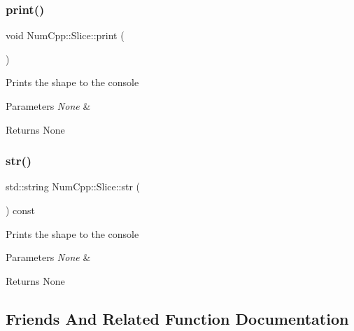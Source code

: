 \subsubsection{\texorpdfstring{print()}{print()}}
{\footnotesize\ttfamily void Num\+Cpp\+::\+Slice\+::print (\begin{DoxyParamCaption}{ }\end{DoxyParamCaption})\hspace{0.3cm}{\ttfamily [inline]}}

Prints the shape to the console


\begin{DoxyParams}{Parameters}
{\em None} & \\
\hline
\end{DoxyParams}
\begin{DoxyReturn}{Returns}
None 
\end{DoxyReturn}
\mbox{\label{class_num_cpp_1_1_slice_a1d653c371a7933ed07c0a0862779edea}} 
\subsubsection{\texorpdfstring{str()}{str()}}
{\footnotesize\ttfamily std\+::string Num\+Cpp\+::\+Slice\+::str (\begin{DoxyParamCaption}{ }\end{DoxyParamCaption}) const\hspace{0.3cm}{\ttfamily [inline]}}

Prints the shape to the console


\begin{DoxyParams}{Parameters}
{\em None} & \\
\hline
\end{DoxyParams}
\begin{DoxyReturn}{Returns}
None 
\end{DoxyReturn}


\subsection{Friends And Related Function Documentation}
\mbox{\label{class_num_cpp_1_1_slice_ad6889d2df295fef3796aebb769b8cac0}} 
